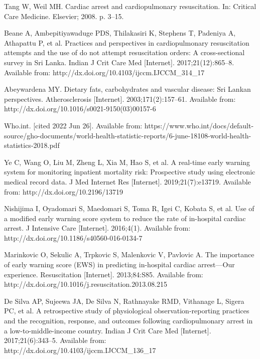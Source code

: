 \begin{thebibliography}{00}

 Tang W, Weil MH. Cardiac arrest and cardiopulmonary resuscitation. In: Critical Care Medicine. Elsevier; 2008. p. 3–15.

Beane A, Ambepitiyawaduge PDS, Thilakasiri K, Stephens T, Padeniya A, Athapattu P, et al. Practices and perspectives in cardiopulmonary resuscitation attempts and the use of do not attempt resuscitation orders: A cross-sectional survey in Sri Lanka. Indian J Crit Care Med [Internet]. 2017;21(12):865–8. Available from: http://dx.doi.org/10.4103/ijccm.IJCCM\_314\_17
 	 
Abeywardena MY. Dietary fats, carbohydrates and vascular disease: Sri Lankan perspectives. Atherosclerosis [Internet]. 2003;171(2):157–61. Available from: http://dx.doi.org/10.1016/s0021-9150(03)00157-6
 	 
Who.int. [cited 2022 Jun 26]. Available from: https://www.who.int/docs/default-source/gho-documents/world-health-statistic-reports/6-june-18108-world-health-statistics-2018.pdf
 	 
Ye C, Wang O, Liu M, Zheng L, Xia M, Hao S, et al. A real-time early warning system for monitoring inpatient mortality risk: Prospective study using electronic medical record data. J Med Internet Res [Internet]. 2019;21(7):e13719. Available from: http://dx.doi.org/10.2196/13719
 	 
Nishijima I, Oyadomari S, Maedomari S, Toma R, Igei C, Kobata S, et al. Use of a modified early warning score system to reduce the rate of in-hospital cardiac arrest. J Intensive Care [Internet]. 2016;4(1). Available from: http://dx.doi.org/10.1186/s40560-016-0134-7
 	 
Marinkovic O, Sekulic A, Trpkovic S, Malenkovic V, Pavlovic A. The importance of early warning score (EWS) in predicting in-hospital cardiac arrest—Our experience. Resuscitation [Internet]. 2013;84:S85. Available from: http://dx.doi.org/10.1016/j.resuscitation.2013.08.215
 	 
De Silva AP, Sujeewa JA, De Silva N, Rathnayake RMD, Vithanage L, Sigera PC, et al. A retrospective study of physiological observation-reporting practices and the recognition, response, and outcomes following cardiopulmonary arrest in a low-to-middle-income country. Indian J Crit Care Med [Internet]. 2017;21(6):343–5. Available from: http://dx.doi.org/10.4103/ijccm.IJCCM\_136\_17
 	 

\end{thebibliography}
